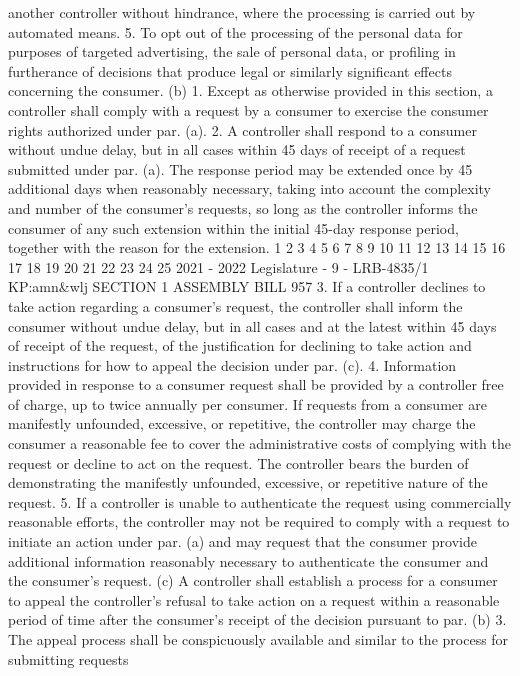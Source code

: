 another controller without hindrance, where the processing is carried out by
automated means.
5. To opt out of the processing of the personal data for purposes of targeted
advertising, the sale of personal data, or profiling in furtherance of decisions that
produce legal or similarly significant effects concerning the consumer.
(b) 1. Except as otherwise provided in this section, a controller shall comply
with a request by a consumer to exercise the consumer rights authorized under par.
(a).
2. A controller shall respond to a consumer without undue delay, but in all cases
within 45 days of receipt of a request submitted under par. (a). The response period
may be extended once by 45 additional days when reasonably necessary, taking into
account the complexity and number of the consumer's requests, so long as the
controller informs the consumer of any such extension within the initial 45-day
response period, together with the reason for the extension.
1
2
3
4
5
6
7
8
9
10
11
12
13
14
15
16
17
18
19
20
21
22
23
24
25
2021 - 2022 Legislature - 9 - LRB-4835/1
KP:amn&wlj
SECTION 1 ASSEMBLY BILL 957
3. If a controller declines to take action regarding a consumer's request, the
controller shall inform the consumer without undue delay, but in all cases and at the
latest within 45 days of receipt of the request, of the justification for declining to take
action and instructions for how to appeal the decision under par. (c).
4. Information provided in response to a consumer request shall be provided
by a controller free of charge, up to twice annually per consumer. If requests from
a consumer are manifestly unfounded, excessive, or repetitive, the controller may
charge the consumer a reasonable fee to cover the administrative costs of complying
with the request or decline to act on the request. The controller bears the burden of
demonstrating the manifestly unfounded, excessive, or repetitive nature of the
request.
5. If a controller is unable to authenticate the request using commercially
reasonable efforts, the controller may not be required to comply with a request to
initiate an action under par. (a) and may request that the consumer provide
additional information reasonably necessary to authenticate the consumer and the
consumer's request.
(c) A controller shall establish a process for a consumer to appeal the
controller's refusal to take action on a request within a reasonable period of time
after the consumer's receipt of the decision pursuant to par. (b) 3. The appeal process
shall be conspicuously available and similar to the process for submitting requests
